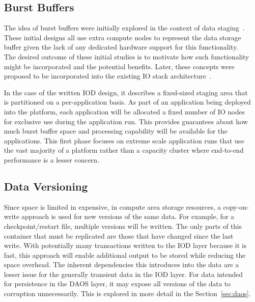 \documentclass[conference]{IEEEtran} \pdfpagewidth=8.5in
\begin{document}
\subsection{Burst Buffers}
\label{sec:burst}

The idea of burst buffers were initially explored in the context of data
staging~\cite{abbasi:2007:datatap,Abbasi:2009:datatap,nisar:2008:staging,zheng:2010:predata}.
These initial designs all use extra compute nodes to represent the data storage
buffer given the lack of any dedicated hardware support for this functionality.
The desired outcome of these initial studies is to motivate how such
functionality might be incorporated and the potential benefits.  Later, these
concepts were proposed to be incorporated into the existing IO stack
architecture~\cite{nowoczynski:2008:zest,bent:2012:challenges,bent:2012:burst-buffer}.

In the case of the written IOD design, it describes a fixed-sized staging area
that is partitioned on a per-application basis. As part of an application
being deployed into the platform, each application will be allocated a fixed
number of IO nodes for exclusive use during the application run. This provides
guarantees about how much burst buffer space and processing capability will be
available for the applications.
%
This first phase focuses on
extreme scale application runs that use the vast majority of a platform rather
than a capacity cluster where end-to-end performance is a lesser concern.

\subsection{Data Versioning}

Since space is limited in expensive, in compute area storage resources, a
copy-on-write approach is used for new versions of the same data. For example,
for a checkpoint/restart file, multiple versions will be written. The only
parts of this container that must be replicated are those that have changed
since the last write. With potentially many transactions written to the IOD
layer because it is fast, this approach will enable additional output to be
stored while reducing the space overhead. The inherent dependencies this
introduces into the data are a lesser issue for the generally transient data
in the IOD layer. For data intended for persistence in the DAOS layer, it may
expose all versions of the data to corruption unnecessarily. This is explored
in more detail in the Section~\ref{sec:daos}.
\end{document}
